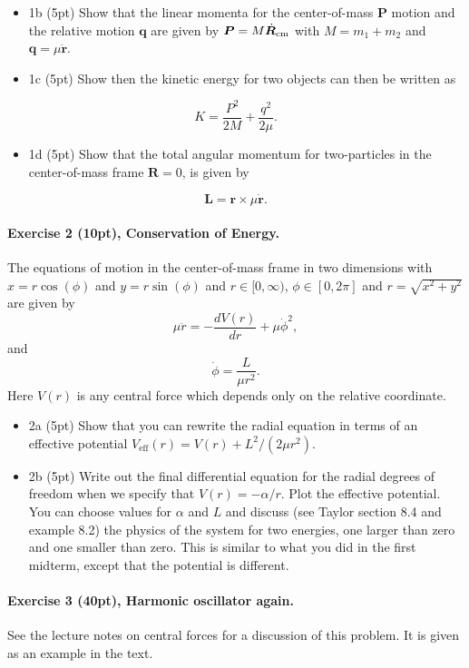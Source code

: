 \documentclass[%
oneside,                 %
final,                   %
10pt]{article}
\begin{document}
\begin{itemize}
\item 1b (5pt) Show that the linear momenta for the center-of-mass $\bm{P}$ motion and the relative motion $\bm{q}$ are given by $\bm{P}=M\dot{\bm{R}}_{\rm cm}$ with $M=m_1+m_2$ and $\bm{q}=\mu\dot{\bm{r}}$.

\item 1c (5pt) Show then the kinetic energy for two objects can then be written as
\end{itemize}

\noindent
\[
K=\frac{P^2}{2M}+\frac{q^2}{2\mu}.
\]

\begin{itemize}
\item 1d (5pt) Show that the total angular momentum for two-particles in the center-of-mass frame $\bm{R}=0$, is given by
\end{itemize}

\noindent
\[
\bm{L}=\bm{r}\times \mu\dot{\bm{r}}.
\]

\paragraph{Exercise 2 (10pt), Conservation of Energy.}
The equations of motion in the center-of-mass frame in two dimensions with $x=r\cos{(\phi)}$ and $y=r\sin{(\phi)}$ and
$r\in [0,\infty)$, $\phi\in [0,2\pi]$ and $r=\sqrt{x^2+y^2}$ are given by
\[
\mu \ddot{r}=-\frac{dV(r)}{dr}+\mu\dot{\phi}^2,
\]
and
\[
\dot{\phi}=\frac{L}{\mu r^2}.
\]
Here $V(r)$ is any central force which depends only on the relative coordinate.
\begin{itemize}
\item 2a (5pt) Show that you can rewrite the radial equation in terms of an effective potential $V_{\mathrm{eff}}(r)=V(r)+L^2/(2\mu r^2)$. 

\item 2b (5pt) Write out the final differential equation for the radial degrees of freedom when we specify that $V(r)=-\alpha/r$.  Plot the effective potential. You can choose values for $\alpha$ and $L$ and discuss (see Taylor section 8.4 and example 8.2) the physics of the system for two energies, one larger than zero and one smaller than zero. This is similar to what you did in the first midterm, except that the potential is different.
\end{itemize}

\noindent
\paragraph{Exercise 3 (40pt), Harmonic oscillator again.}
See the lecture notes on central forces for a discussion of this problem. It is given as an example in the text.
\end{document}
